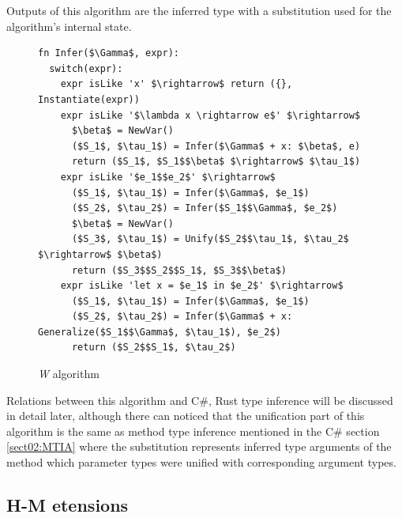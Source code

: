 Outputs of this algorithm are the inferred type with a substitution used for the algorithm's internal state. 
\begin{figure}
\begin{lstlisting}[style=myAlgo, mathescape=true]
fn Infer($\Gamma$, expr):
  switch(expr):
    expr isLike 'x' $\rightarrow$ return ({}, Instantiate(expr))
    expr isLike '$\lambda x \rightarrow e$' $\rightarrow$
      $\beta$ = NewVar()
      ($S_1$, $\tau_1$) = Infer($\Gamma$ + x: $\beta$, e)
      return ($S_1$, $S_1$$\beta$ $\rightarrow$ $\tau_1$)
    expr isLike '$e_1$$e_2$' $\rightarrow$
      ($S_1$, $\tau_1$) = Infer($\Gamma$, $e_1$)
      ($S_2$, $\tau_2$) = Infer($S_1$$\Gamma$, $e_2$)
      $\beta$ = NewVar()
      ($S_3$, $\tau_1$) = Unify($S_2$$\tau_1$, $\tau_2$ $\rightarrow$ $\beta$)
      return ($S_3$$S_2$$S_1$, $S_3$$\beta$)
    expr isLike 'let x = $e_1$ in $e_2$' $\rightarrow$
      ($S_1$, $\tau_1$) = Infer($\Gamma$, $e_1$)
      ($S_2$, $\tau_2$) = Infer($\Gamma$ + x: Generalize($S_1$$\Gamma$, $\tau_1$), $e_2$)
      return ($S_2$$S_1$, $\tau_2$)
\end{lstlisting}
\caption{\textit{W} algorithm}
\label{img16:w}
\end{figure}
\par
Relations between this algorithm and C\#, Rust type inference will be discussed in detail later, although there can noticed that the unification part of this algorithm is the same as method type inference mentioned in the C\# section \ref{sect02:MTIA} where the substitution represents inferred type arguments of the method which parameter types were unified with corresponding argument types.

\newpage

\subsection{H-M etensions}

